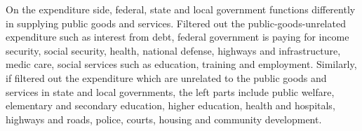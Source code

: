 On the expenditure side, federal, state and local government functions differently in supplying public goods and services. Filtered out the public-goods-unrelated expenditure such as interest from debt, federal government is paying for income security, social security, health, national defense, highways and infrastructure, medic care, social services such as education, training and employment. Similarly, if filtered out the expenditure which are unrelated to the public goods and services in state and local governments, the left parts include public welfare, elementary and secondary education, higher education, health and hospitals, highways and roads, police, courts, housing and community development.
\begin{figure}[H]
    \centering  %
   

\end{figure}

